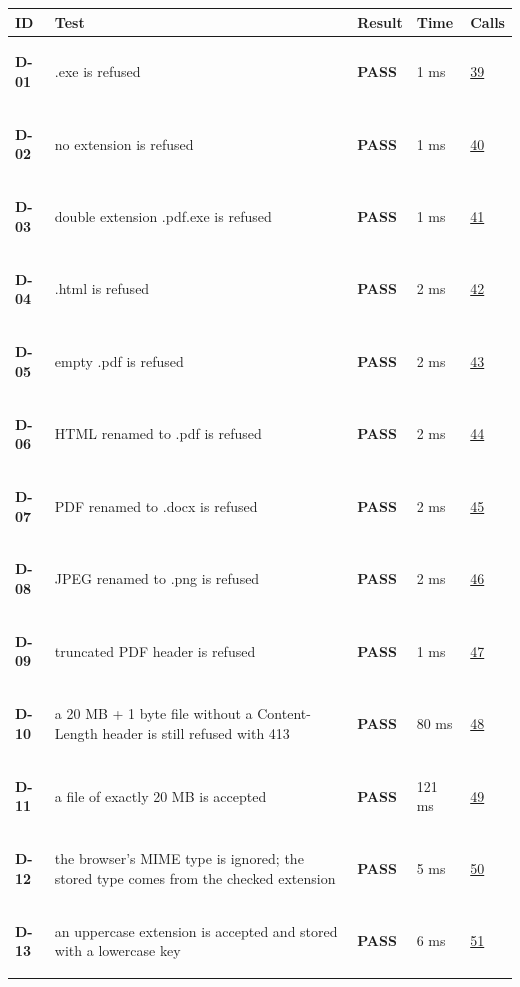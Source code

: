 \documentclass[10pt,a4paper]{article}
\begin{document}
\begin{longtable}{@{}P{1.2cm}P{9.2cm}P{1.2cm}P{1.3cm}P{2.4cm}@{}}
\toprule \textbf{ID} & \textbf{Test} & \textbf{Result} & \textbf{Time} & \textbf{Calls} \\ \midrule \endhead
\hypertarget{test-D-01}{\textbf{D-01}} & .exe is refused & \textcolor{passgreen}{\textbf{PASS}} & 1 ms & \hyperlink{call39}{39} \\
\hypertarget{test-D-02}{\textbf{D-02}} & no extension is refused & \textcolor{passgreen}{\textbf{PASS}} & 1 ms & \hyperlink{call40}{40} \\
\hypertarget{test-D-03}{\textbf{D-03}} & double extension .pdf.exe is refused & \textcolor{passgreen}{\textbf{PASS}} & 1 ms & \hyperlink{call41}{41} \\
\hypertarget{test-D-04}{\textbf{D-04}} & .html is refused & \textcolor{passgreen}{\textbf{PASS}} & 2 ms & \hyperlink{call42}{42} \\
\hypertarget{test-D-05}{\textbf{D-05}} & empty .pdf is refused & \textcolor{passgreen}{\textbf{PASS}} & 2 ms & \hyperlink{call43}{43} \\
\hypertarget{test-D-06}{\textbf{D-06}} & HTML renamed to .pdf is refused & \textcolor{passgreen}{\textbf{PASS}} & 2 ms & \hyperlink{call44}{44} \\
\hypertarget{test-D-07}{\textbf{D-07}} & PDF renamed to .docx is refused & \textcolor{passgreen}{\textbf{PASS}} & 2 ms & \hyperlink{call45}{45} \\
\hypertarget{test-D-08}{\textbf{D-08}} & JPEG renamed to .png is refused & \textcolor{passgreen}{\textbf{PASS}} & 2 ms & \hyperlink{call46}{46} \\
\hypertarget{test-D-09}{\textbf{D-09}} & truncated PDF header is refused & \textcolor{passgreen}{\textbf{PASS}} & 1 ms & \hyperlink{call47}{47} \\
\hypertarget{test-D-10}{\textbf{D-10}} & a 20 MB + 1 byte file without a Content-Length header is still refused with 413 & \textcolor{passgreen}{\textbf{PASS}} & 80 ms & \hyperlink{call48}{48} \\
\hypertarget{test-D-11}{\textbf{D-11}} & a file of exactly 20 MB is accepted & \textcolor{passgreen}{\textbf{PASS}} & 121 ms & \hyperlink{call49}{49} \\
\hypertarget{test-D-12}{\textbf{D-12}} & the browser's MIME type is ignored; the stored type comes from the checked extension & \textcolor{passgreen}{\textbf{PASS}} & 5 ms & \hyperlink{call50}{50} \\
\hypertarget{test-D-13}{\textbf{D-13}} & an uppercase extension is accepted and stored with a lowercase key & \textcolor{passgreen}{\textbf{PASS}} & 6 ms & \hyperlink{call51}{51} \\

\end{longtable}
\end{document}
